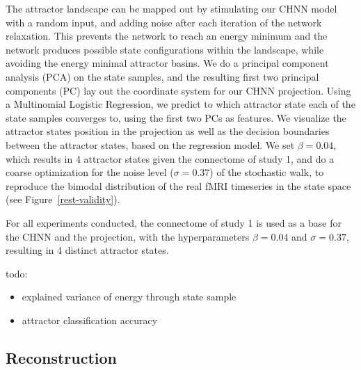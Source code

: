 \documentclass{article}
\begin{document}
The attractor landscape can be mapped out by stimulating our CHNN model with a random input, and adding noise after
each iteration of the network relaxation. This prevents the network to reach an energy minimum and the network
produces possible state configurations within the landscape, while avoiding the energy minimal attractor basins.
We do a principal component analysis (PCA) on the state samples, and the resulting first two principal components (PC)
lay out the coordinate system for our CHNN projection. Using a Multinomial Logistic Regression, we predict to which
attractor state each of the state samples converges to, using the first two PCs as features. We visualize the attractor
states position in the projection as well as the decision boundaries between the attractor states, based on the
regression model. We set $\beta = 0.04$, which results in 4 attractor states given the connectome of study 1, and do a
coarse optimization for the noise level ($\sigma=0.37$) of the stochastic walk, to reproduce the bimodal distribution
of the real fMRI timeseries in the state space (see Figure~\ref{rest-validity}).

For all experiments conducted, the connectome of study 1 is used as a base for the CHNN and the projection, with the
hyperparameters $\beta = 0.04$ and $\sigma=0.37$, resulting in 4 distinct attractor states.

todo:

\begin{itemize}
\item explained variance of energy through state sample
\item attractor classification accuracy
\end{itemize}

\subsection{Reconstruction}\label{Reconstruction}
\end{document}
